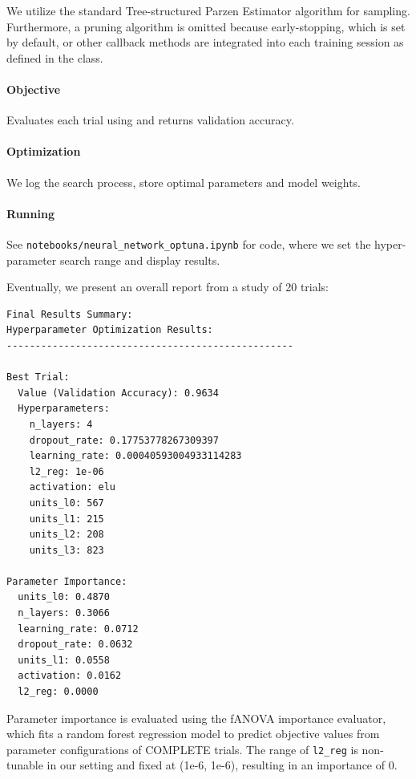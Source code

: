 \documentclass{article}
\begin{document}
We utilize the standard Tree-structured Parzen Estimator algorithm for sampling. Furthermore, a pruning algorithm is omitted because early-stopping, which is set by default, or other callback methods are integrated into each training session as defined in the  class.

\paragraph{Objective\cite{optuna_first_study}}
Evaluates each trial using  and returns validation accuracy.

\paragraph{Optimization} 
We log the search process, store optimal parameters and model weights.

\paragraph{Running}
See \texttt{notebooks/neural\_network\_optuna.ipynb} for code, where we set the hyper-parameter search range and display results. 

Eventually, we present an overall report from a study of 20 trials:

\begin{lstlisting}[style=input, caption=Hyperparameter Optimization Results]
Final Results Summary:
Hyperparameter Optimization Results:
--------------------------------------------------

Best Trial:
  Value (Validation Accuracy): 0.9634
  Hyperparameters:
    n_layers: 4
    dropout_rate: 0.17753778267309397
    learning_rate: 0.00040593004933114283
    l2_reg: 1e-06
    activation: elu
    units_l0: 567
    units_l1: 215
    units_l2: 208
    units_l3: 823

Parameter Importance:
  units_l0: 0.4870
  n_layers: 0.3066
  learning_rate: 0.0712
  dropout_rate: 0.0632
  units_l1: 0.0558
  activation: 0.0162
  l2_reg: 0.0000
\end{lstlisting}
Parameter importance is evaluated using the fANOVA importance evaluator\cite{optuna_param_importances}, which fits a random forest regression model to predict objective values from parameter configurations of COMPLETE trials. The range of \texttt{l2\_reg} is non-tunable in our setting and fixed at (1e-6, 1e-6), resulting in an importance of 0.
\end{document}
